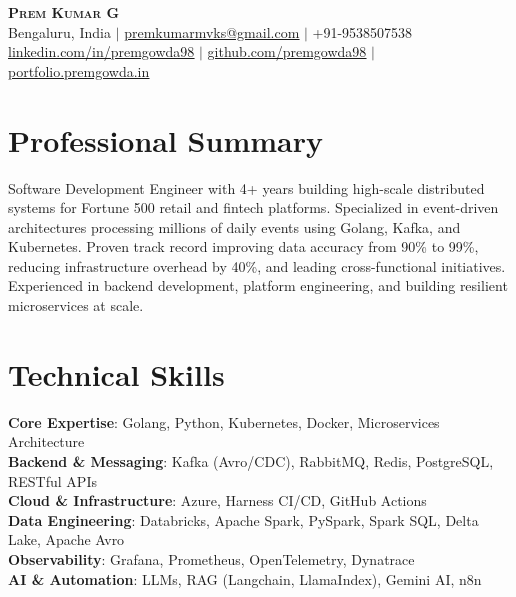 \documentclass[letterpaper,11pt]{article}
\begin{document}
\begin{center}
    \textbf{\Huge \scshape Prem Kumar G} \\ \vspace{1pt}
    \small Bengaluru, India $|$
    \href{mailto:premkumarmvks@gmail.com}{\underline{premkumarmvks@gmail.com}} $|$
    +91-9538507538 \\
    \href{https://linkedin.com/in/premgowda98}{\underline{linkedin.com/in/premgowda98}} $|$
    \href{https://github.com/premgowda98}{\underline{github.com/premgowda98}} $|$
    \href{https://portfolio.premgowda.in}{\underline{portfolio.premgowda.in}}
\end{center}

\section{Professional Summary}
\small{Software Development Engineer with 4+ years building high-scale distributed systems for Fortune 500 retail and fintech platforms. Specialized in event-driven architectures processing millions of daily events using Golang, Kafka, and Kubernetes. Proven track record improving data accuracy from 90\% to 99\%, reducing infrastructure overhead by 40\%, and leading cross-functional initiatives. Experienced in backend development, platform engineering, and building resilient microservices at scale.}

\section{Technical Skills}
 \begin{itemize}[leftmargin=0.15in, label={}]
    \small{\item{
     \textbf{Core Expertise}{: Golang, Python, Kubernetes, Docker, Microservices Architecture} \\
     \textbf{Backend \& Messaging}{: Kafka (Avro/CDC), RabbitMQ, Redis, PostgreSQL, RESTful APIs} \\
     \textbf{Cloud \& Infrastructure}{: Azure, Harness CI/CD, GitHub Actions} \\
     \textbf{Data Engineering}{: Databricks, Apache Spark, PySpark, Spark SQL, Delta Lake, Apache Avro} \\
     \textbf{Observability}{: Grafana, Prometheus, OpenTelemetry, Dynatrace} \\
     \textbf{AI \& Automation}{: LLMs, RAG (Langchain, LlamaIndex), Gemini AI, n8n}
    }}
 \end{itemize}
\end{document}
